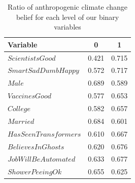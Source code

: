 \newpage

\begin{table}[h]
    \centering
    \begin{tabular}{|l|c|c|}
        \hline
        \textbf{Variable} & \textbf{0} & \textbf{1}\\
        \hline
        $ScientistsGood$ & 0.421 & 0.715\\
        $SmartSadDumbHappy$ & 0.572 & 0.717\\
        \hline
        $Male$ & 0.689 & 0.589\\
        $VaccinesGood$ & 0.577 & 0.653\\
        $College$ & 0.582 & 0.657\\
        $Married$ & 0.684 & 0.601\\
        \hline
        $HasSeenTransformers$ & 0.610 & 0.667\\
        $BelievesInGhosts$ & 0.620 & 0.676\\
        \hline
        $JobWillBeAutomated$ & 0.633 & 0.677\\
        $ShowerPeeingOk$ & 0.655 & 0.625\\
        \hline
    \end{tabular}
    \caption{Ratio of anthropogenic climate change belief for each level of our binary variables}
    \label{tab:EDA_tables}
\end{table}

\vspace{.4in}

